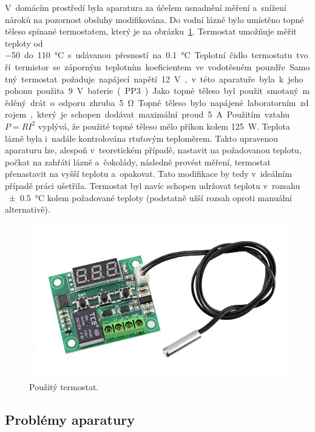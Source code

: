\documentclass[12pt]{article}
\begin{document}
\par\noindent
V~domácím prostředí byla aparatura za účelem usnadnění měření a~snížení nároků na pozornost obsluhy modifikována. Do vodní lázně bylo umístěno topné těleso spínané termostatem, který je na obrázku~\ref{fig:termostat}. Termostat umožňuje měřit teploty od \SI{-50} do \SI{110}{\degreeCelsius} s~udávanou přesností na \SI{0,1}{\degreeCelsius}. Teplotní čidlo termostatu tvoří termistor se záporným teplotním koeficientem ve vodotěsném pouzdře. Samotný termostat požaduje napájecí napětí \SI{12}{\volt}, v~této aparatuře byla k~jeho pohonu použita \SI{9}{\volt} baterie (PP3). Jako topné těleso byl použit smotaný měděný drát o~odporu zhruba \SI{5}{\ohm}. Topné těleso bylo napájené laboratorním zdrojem, který je schopen dodávat maximální proud \SI{5}{\ampere}. Použitím vztahu $P=RI^2$ vyplývá, že použité topné těleso mělo příkon kolem \SI{125}{\watt}. Teplota lázně byla i~nadále kontrolována rtuťovým teploměrem. Takto upravenou aparaturu lze, alespoň v~teoretickém případě, nastavit na požadovanou teplotu, počkat na zahřátí lázně a~čokolády, následně provést měření, termostat přenastavit na vyšší teplotu a~opakovat. Tato modifikace by tedy v~ideálním případě práci ušetřila. Termostat byl navíc schopen udržovat teplotu v~rozsahu \SI{\pm 0,5}{\degreeCelsius} kolem požadované teploty (podstatně užší rozsah oproti manuální alternativě).

\begin{figure}
    \centering
    \includegraphics[width = 0.5\linewidth]{figures/termostat.jpg}
    \caption{Použitý termostat.~\cite{Figure:termostat}}
    \label{fig:termostat}
\end{figure}

\subsection{Problémy aparatury}%
\end{document}
